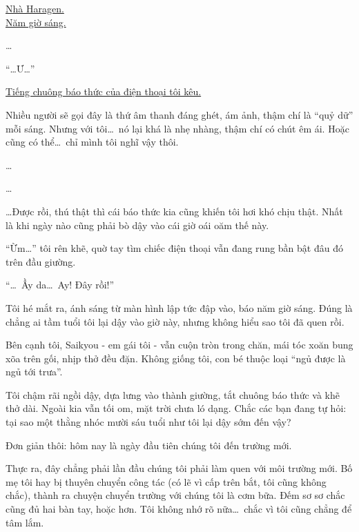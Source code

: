 \documentclass[../main.tex]{subfiles}
\begin{document}

\begin{center}
  \uline{Nhà Haragen.\\Năm giờ sáng.}
\end{center}

\dots

``\dots Ư\dots''

\href{https://www.youtube.com/watch?v=Mqokmn0WOMo}{Tiếng chuông báo thức của điện thoại tôi kêu.}

Nhiều người sẽ gọi đây là thứ âm thanh đáng ghét, ám ảnh, thậm chí là ``quỷ dữ'' mỗi sáng. Nhưng với tôi\dots\ nó lại khá là nhẹ nhàng, thậm chí có chút êm ái. Hoặc cũng có thể\dots\ chỉ mình tôi nghĩ vậy thôi.

\dots

\dots

\dots Được rồi, thú thật thì cái báo thức kia cũng khiến tôi hơi khó chịu thật. Nhất là khi ngày nào cũng phải bò dậy vào cái giờ oái oăm thế này.

``Ừm\dots'' tôi rên khẽ, quờ tay tìm chiếc điện thoại vẫn đang rung bần bật đâu đó trên đầu giường.

``\dots\ Ầy da\dots\ Ay! Đây rồi!''

Tôi hé mắt ra, ánh sáng từ màn hình lập tức đập vào, báo năm giờ sáng. Đúng là chẳng ai tầm tuổi tôi lại dậy vào giờ này, nhưng không hiểu sao tôi đã quen rồi.

Bên cạnh tôi, Saikyou - em gái tôi - vẫn cuộn tròn trong chăn, mái tóc xoăn bung xõa trên gối, nhịp thở đều đặn. Không giống tôi, con bé thuộc loại ``ngủ được là ngủ tới trưa''.

Tôi chậm rãi ngồi dậy, dựa lưng vào thành giường, tắt chuông báo thức và khẽ thở dài. Ngoài kia vẫn tối om, mặt trời chưa ló dạng. Chắc các bạn đang tự hỏi: tại sao một thằng nhóc mười sáu tuổi như tôi lại dậy sớm đến vậy?

Đơn giản thôi: hôm nay là ngày đầu tiên chúng tôi đến trường mới.

Thực ra, đây chẳng phải lần đầu chúng tôi phải làm quen với môi trường mới. Bố mẹ tôi hay bị thuyên chuyển công tác (có lẽ vì cấp trên bắt, tôi cũng không chắc), thành ra chuyện chuyển trường với chúng tôi là cơm bữa. Đếm sơ sơ chắc cũng đủ hai bàn tay, hoặc hơn. Tôi không nhớ rõ nữa\dots\ chắc vì tôi cũng chẳng để tâm lắm.
\end{document}

